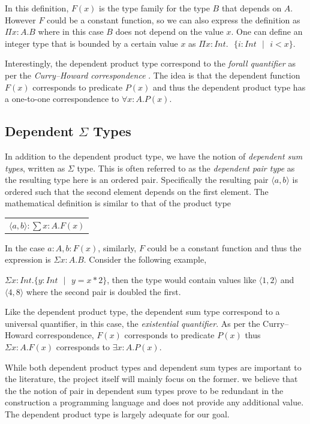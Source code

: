 \documentclass[a4paper,12pt]{report}
\begin{document}
In this definition, $F(x)$ is the type family for the type $B$ that depends on $A$.
However $F$ could be a constant function, so we can also express the definition 
as $\Pi x:A.B$ where in this case $B$ does not depend 
on the value $x$. One can define an integer type that is bounded by a certain 
value $x$ as $\Pi x:Int.\text{ }\{ i:Int\text{ }|\text{ }i < x\}$.

\par
Interestingly, the dependent product type correspond to the 
\textit{forall quantifier} as per 
the \textit{Curry–Howard correspondence} \cite{cHoward}. The idea is that the dependent 
function $F(x)$ corresponds to predicate $P(x)$ and thus the dependent product 
type has a one-to-one correspondence to $\forall x: A. P(x)$.

\subsection{Dependent $\Sigma$ Types}
In addition to the dependent product type, we have the notion of \textit{dependent sum 
types}, written as $\Sigma$ type. This is often referred to as the 
\textit{dependent pair type} as the resulting type here is an ordered pair. 
Specifically the resulting pair $\langle a,b \rangle$ is ordered such that the 
second element depends on the first element. The 
mathematical definition is similar to that of the product type
\begin{center}
 \begin{tabular}{l}
   $\langle a,b \rangle :\sum x: A.  F(x)$
 \end{tabular} 
\end{center}
In the case $a:A, b: F(x)$, similarly, $F$ could be a constant function and thus 
the expression is $\Sigma x:A.B$. Consider the following example, 

$\Sigma x: Int.\{y:Int\text{ }|\text{ } y = x * 2\}$, then the type would 
contain values like $\langle 1,2 \rangle$ and $\langle 4,8 \rangle$ where the 
second pair is doubled the first.

\par
Like the dependent product type, the dependent sum type correspond to a 
universal quantifier, in this case, the \textit{existential quantifier}. As 
per the Curry–Howard correspondence, $F(x)$ corresponds to predicate $P(x)$ 
thus $\Sigma x:A.F(x)$ corresponds to $\exists x: A. P(x)$.

\par
While both dependent product types and dependent sum types are important to the 
literature, the project itself will mainly focus on the former. we believe that 
the the notion of pair in dependent sum types prove to be redundant in 
the construction a programming language and does not provide any additional 
value. The dependent product type is largely adequate for our goal.
\end{document}
